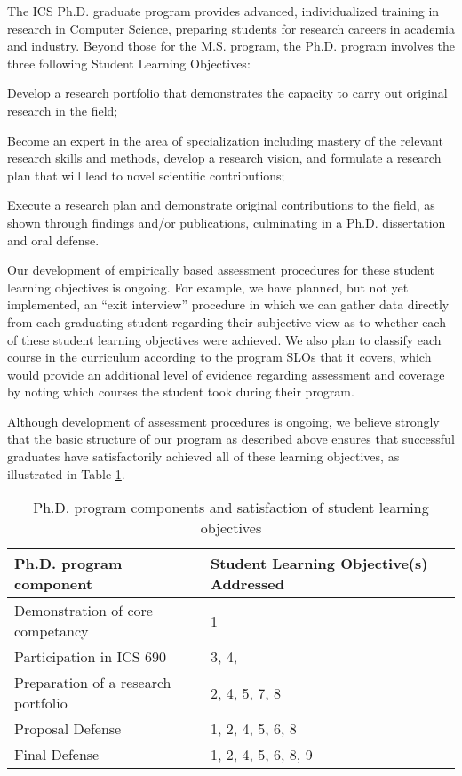 \documentclass[12pt]{article}
\begin{document}
The ICS Ph.D. graduate program provides advanced, individualized training in research 
in Computer Science, preparing students for research careers in academia and industry.  
Beyond  those for the M.S. program, the Ph.D. program involves the three following 
Student Learning Objectives:

\begin{list}{.}{ \setcounter{listcounter}{6}}
\item Develop a research portfolio that demonstrates the capacity to carry out original 
research in the field;
\item Become an expert in the area of specialization including mastery of the relevant 
research skills and methods, develop a research vision, and formulate a research plan 
that will lead to novel scientiﬁc contributions;
\item Execute a research plan and demonstrate original contributions to the field, as 
shown through ﬁndings and/or publications, culminating in a Ph.D. dissertation and oral 
defense.
\end{list}

Our development of empirically based assessment procedures for these student learning
objectives is ongoing.  For example, we have planned, but not yet
implemented, an ``exit interview'' procedure in which we can gather data
directly from each graduating student regarding their subjective view as to
whether each of these student learning objectives were achieved. We also
plan to classify each course in the curriculum according to the program
SLOs that it covers, which would provide an additional level of evidence
regarding assessment and coverage by noting which courses the student took
during their program. 

Although development of assessment procedures is ongoing, we believe
strongly that the basic structure of our program as described above ensures
that successful graduates have satisfactorily achieved all of these
learning objectives, as illustrated in Table \ref{phd.slos}.

\begin{table}[htbp]
\begin{center}
\caption{Ph.D. program components and satisfaction of student learning
  objectives}
\label{phd.slos}
\begin{tabular}{|l|l|} \hline
{\bf Ph.D. program component} & {\bf Student Learning Objective(s) Addressed}  \\ \hline
Demonstration of core competancy & 1 \\
Participation in ICS 690 & 3, 4,  \\
Preparation of a research portfolio & 2, 4, 5, 7, 8 \\
Proposal Defense & 1, 2, 4, 5, 6, 8 \\
Final Defense & 1, 2, 4, 5, 6, 8, 9 \\ \hline
\end{tabular}
\end{center}
\end{table}
\end{document}
